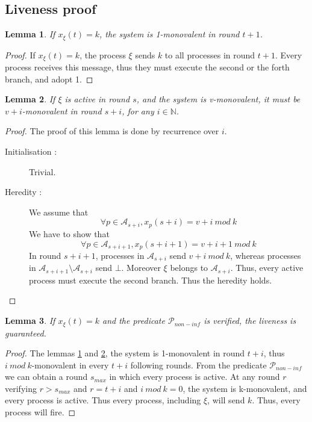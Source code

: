 \documentclass{article}
\newtheorem{lemma}{Lemma}[section]
\begin{document}
\subsection{Liveness proof}

\begin{lemma}\label{lem:k_mono}
	If $x_\xi(t) = k$, the system is 1-monovalent in round $t+1$.
\end{lemma}
\begin{proof}
	If $x_\xi(t) = k$, the process $\xi$ sends $k$ to all processes in round $t+1$.
	Every process receives this message, thus they must execute the second or the forth branch, and adopt 1.
\end{proof}

\begin{lemma}\label{lem:mono_mono}
	If $\xi$ is active in round $s$, and the system is v-monovalent, it must be $v+i$-monovalent in round $s+i$,
	for any $i \in \mathds{N}$.
\end{lemma}
\begin{proof}
	The proof of this lemma is done by recurrence over $i$.
	\begin{description}
		\item[Initialisation :] Trivial.
		\item[Heredity :] We assume that
			$$\forall p \in \mathcal{A}_{s+i}, x_p(s+i) = v+i~mod~k$$
			We have to show that 
			$$\forall p \in \mathcal{A}_{s+i+1}, x_p(s+i+1) = v+i+1~mod~k$$
			In round $s+i+1$, processes in $\mathcal{A}_{s+i}$ send $v+i~mod~k$, whereas processes 
			in $\mathcal{A}_{s+i+1} \setminus \mathcal{A}_{s+i}$ send $\bot$.
			Moreover $\xi$ belongs to $\mathcal{A}_{s+i}$.
			Thus, every active process must execute the second branch.
			Thus the heredity holds.
	\end{description}
\end{proof}

\begin{lemma}\label{lem:k_liv}
	If $x_\xi(t) = k$ and the predicate $\mathcal{P}_{non-inf}$ is verified, the liveness is guaranteed.
\end{lemma}
\begin{proof}
	The lemmas \ref{lem:k_mono} and \ref{lem:mono_mono}, the system is 1-monovalent in round $t+i$,
	thus $i~mod~k$-monovalent in every $t+i$ following rounds.
	From the predicate $\mathcal{P}_{non-inf}$ we can obtain a round $s_{max}$ in which every process is active.
	At any round $r$ verifying $r > s_{max}$ and $r = t + i$ and $i~mod~k = 0$, the system is k-monovalent,
	and every process is active. Thus every process, including $\xi$, will send $k$.
	Thus, every process will fire.
\end{proof}
\end{document}
